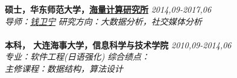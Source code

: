 \documentclass{resume}
\newcommand\fs{\CJKfamily{fs}}
\newcommand{\sanhao}{\fontsize{16pt}{\baselineskip}\selectfont}
\newcommand{\sihao}{\fontsize{14pt}{\baselineskip}\selectfont}
\begin{document}



\begin{rSection}{\fs \sanhao {教育经历}}
\sihao \textbf {硕士，华东师范大学，\href{http://database.ecnu.edu.cn}{海量计算研究所}} \hfill {\em 2014,09-2017,06}\\
\sihao \textit{导师：\href{https://wnqian.wordpress.com/}{钱卫宁}}   
\sihao \textit{研究方向：大数据分析，社交媒体分析}\\
\\
\sihao \textbf {本科， 大连海事大学，信息科学与技术学院} \hfill {\em 2010,09-2014,06}\\
\sihao \textit{专业：软件工程(日语强化)}
\sihao \textit{综合绩点：}  \\
\sihao \textit{主修课程：数据结构，算法设计}\\


\end{rSection}



\end{document}
